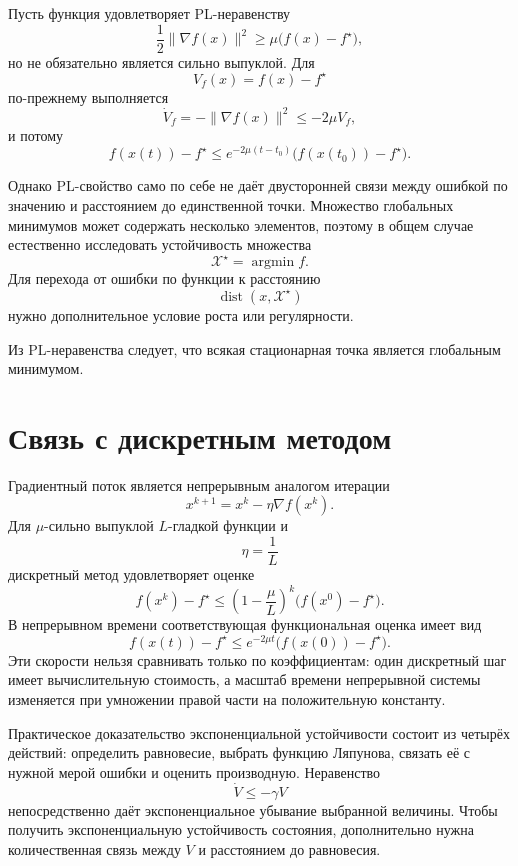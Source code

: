 Пусть функция удовлетворяет PL-неравенству
\[
    \frac12\lVert\nabla f(x)\rVert^2
    \ge
    \mu\bigl(f(x)-f^\star\bigr),
\]
но не обязательно является сильно выпуклой. Для
\[
    V_f(x)=f(x)-f^\star
\]
по-прежнему выполняется
\[
    \dot V_f
    =
    -\lVert\nabla f(x)\rVert^2
    \le
    -2\mu V_f,
\]
и потому
\[
    f(x(t))-f^\star
    \le
    e^{-2\mu(t-t_0)}
    \bigl(f(x(t_0))-f^\star\bigr).
\]

Однако PL-свойство само по себе не даёт двусторонней связи между
ошибкой по значению и расстоянием до единственной точки. Множество
глобальных минимумов может содержать несколько элементов, поэтому в
общем случае естественно исследовать устойчивость множества
\[
    \mathcal X^\star
    =
    \operatorname*{argmin}f.
\]
Для перехода от ошибки по функции к расстоянию
\[
    \operatorname{dist}(x,\mathcal X^\star)
\]
нужно дополнительное условие роста или регулярности.

Из PL-неравенства следует, что всякая стационарная точка является глобальным минимумом.

\section{Связь с дискретным методом}

Градиентный поток является непрерывным аналогом итерации
\[
    x^{k+1}
    =
    x^k-\eta\nabla f(x^k).
\]
Для \(\mu\)-сильно выпуклой \(L\)-гладкой функции и
\[
    \eta=\frac1L
\]
дискретный метод удовлетворяет оценке
\[
    f(x^k)-f^\star
    \le
    \left(1-\frac\mu L\right)^k
    \bigl(f(x^0)-f^\star\bigr).
\]
В непрерывном времени соответствующая функциональная оценка имеет
вид
\[
    f(x(t))-f^\star
    \le
    e^{-2\mu t}
    \bigl(f(x(0))-f^\star\bigr).
\]
Эти скорости нельзя сравнивать только по коэффициентам: один
дискретный шаг имеет вычислительную стоимость, а масштаб времени
непрерывной системы изменяется при умножении правой части на
положительную константу.

Практическое доказательство экспоненциальной устойчивости состоит из
четырёх действий: определить равновесие, выбрать функцию Ляпунова,
связать её с нужной мерой ошибки и оценить производную. Неравенство
\[
    \dot V\le-\gamma V
\]
непосредственно даёт экспоненциальное убывание выбранной величины.
Чтобы получить экспоненциальную устойчивость состояния, дополнительно
нужна количественная связь между \(V\) и расстоянием до равновесия.
